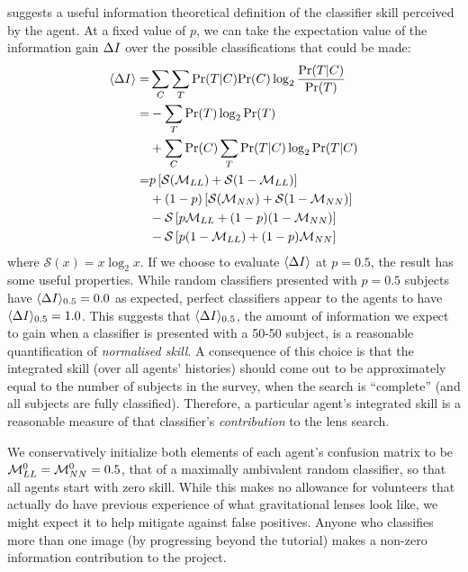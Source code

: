 \documentclass[useAMS,usenatbib,a4paper]{mn2e}
\begin{document}
 suggests a useful information theoretical 
definition of the classifier skill  perceived by the agent. At a fixed
value of $p$, we can take the expectation value of the information gain
$\Delta I$ over  the possible classifications that could be made:
\begin{align}
\langle\Delta I\rangle   =& \sum_C \sum_T {\rm Pr}(T|C) {\rm Pr}(C) \log_2 \frac{{\rm Pr}(T|C)}{{\rm Pr}(T)} \notag \\ 
         =& - \sum_T {\rm Pr}(T) \log_2 {\rm Pr}(T) \notag \\ 
          & + \sum_C {\rm Pr}(C) \sum_T {\rm Pr}(T|C) \log_2 {\rm Pr}(T|C) \notag \\ 
         =&         p  \left[ \mathcal{S}(\mathcal{M}_{LL}) + \mathcal{S}(1-\mathcal{M}_{LL}) \right] \notag \\
          &     +(1-p) \left[ \mathcal{S}(\mathcal{M}_{NN}) + \mathcal{S}(1-\mathcal{M}_{NN}) \right] \notag \\
          & - \mathcal{S}\left[ p    \mathcal{M}_{LL}       + (1-p)(1-\mathcal{M}_{NN})     \right] \notag \\
          & - \mathcal{S}\left[ p (1-\mathcal{M}_{LL})      + (1-p)   \mathcal{M}_{NN}      \right] 
\end{align}
where $\mathcal{S}(x) = x \log_2{x}$. If we choose to
evaluate $\langle\Delta I\rangle$ at $p = 0.5$, the result has some
useful properties. While random classifiers presented with  $p = 0.5$
subjects have ${\langle \Delta I \rangle_{0.5}} = 0.0$  as expected, perfect classifiers appear to
the agents to have  ${\langle \Delta I \rangle_{0.5}} = 1.0$. This suggests that  ${\langle \Delta I \rangle_{0.5}}$, the
amount of information we expect to  gain when a classifier is presented
with a 50-50 subject, is a reasonable quantification of 
\emph{normalised skill}. A consequence of this choice is that the
integrated skill (over all agents' histories) should come out to be
approximately 
equal to the number of subjects in the survey, when the search is
``complete'' (and all subjects are fully classified). Therefore, a
particular agent's integrated skill is a reasonable 
measure of that classifier's
\emph{contribution} to the lens search.

We conservatively initialize both elements of each  agent's confusion
matrix to be $\mathcal{M}^0_{LL} = \mathcal{M}^0_{NN} = 0.5$, that of a maximally ambivalent  random classifier, so
that all agents start with zero skill. While  this makes no allowance
for volunteers that actually do have previous experience of what
gravitational lenses look like, we might expect it to help mitigate
against false positives. Anyone who classifies more than one image (by
progressing beyond the tutorial) makes a non-zero information
contribution to the project.
\end{document}
